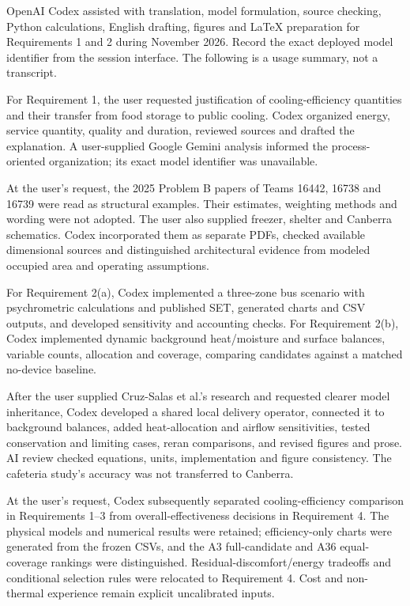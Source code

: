 \documentclass[12pt]{article}
\begin{document}
OpenAI Codex assisted with translation, model formulation, source checking, Python calculations, English drafting, figures and LaTeX preparation for Requirements 1 and 2 during November 2026. Record the exact deployed model identifier from the session interface. The following is a usage summary, not a transcript.

For Requirement 1, the user requested justification of cooling-efficiency quantities and their transfer from food storage to public cooling. Codex organized energy, service quantity, quality and duration, reviewed sources and drafted the explanation. A user-supplied Google Gemini analysis informed the process-oriented organization; its exact model identifier was unavailable.

At the user's request, the 2025 Problem B papers of Teams 16442, 16738 and 16739 were read as structural examples. Their estimates, weighting methods and wording were not adopted. The user also supplied freezer, shelter and Canberra schematics. Codex incorporated them as separate PDFs, checked available dimensional sources and distinguished architectural evidence from modeled occupied area and operating assumptions.

For Requirement 2(a), Codex implemented a three-zone bus scenario with psychrometric calculations and published SET, generated charts and CSV outputs, and developed sensitivity and accounting checks. For Requirement 2(b), Codex implemented dynamic background heat/moisture and surface balances, variable counts, allocation and coverage, comparing candidates against a matched no-device baseline.

After the user supplied Cruz-Salas et al.'s research and requested clearer model inheritance, Codex developed a shared local delivery operator, connected it to background balances, added heat-allocation and airflow sensitivities, tested conservation and limiting cases, reran comparisons, and revised figures and prose. AI review checked equations, units, implementation and figure consistency. The cafeteria study's accuracy was not transferred to Canberra.

At the user's request, Codex subsequently separated cooling-efficiency comparison in Requirements 1--3 from overall-effectiveness decisions in Requirement 4. The physical models and numerical results were retained; efficiency-only charts were generated from the frozen CSVs, and the A3 full-candidate and A36 equal-coverage rankings were distinguished. Residual-discomfort/energy tradeoffs and conditional selection rules were relocated to Requirement 4. Cost and non-thermal experience remain explicit uncalibrated inputs.
\end{document}

